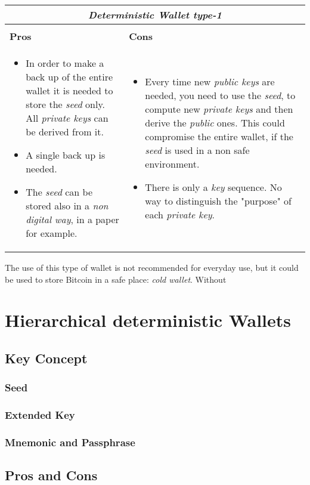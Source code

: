 \begin{center}
	\begin{tabular}{ |p{6cm}|p{6cm}|  }
		\hline
		\multicolumn{2}{|c|}{\textbf{\textit{Deterministic Wallet type-1}}} \\
		\hline \hline 
		\\
		\centerline{\textbf{Pros}}&\centerline{\textbf{Cons}}\\
		\hline
		\begin{itemize}
			\item In order to make a back up of the entire wallet it is needed to store the \textit{seed} only. All \textit{private keys} can be derived from it.
			\item A single back up is needed.
			\item The \textit{seed} can be stored also in a \textit{non digital way}, in a paper for example.
		\end{itemize} &
		\begin{itemize}
			\item Every time new \textit{public keys} are needed, you need to use the \textit{seed}, to compute new \textit{private keys} and then derive the \textit{public} ones. This could compromise the entire wallet, if the \textit{seed} is used in a non safe environment.
			\item There is only a \textit{key} sequence. No way to distinguish the "purpose" of each \textit{private key}.
		\end{itemize}\\
		\hline
	\end{tabular}
\end{center}
The use of this type of wallet is not recommended for everyday use, but it could be used to store Bitcoin in a safe place: \textit{cold wallet}. Without 


\section{Hierarchical deterministic Wallets}

\subsection{Key Concept}

\subsubsection{Seed}

\subsubsection{Extended Key}

\subsubsection{Mnemonic and Passphrase}

\subsection{Pros and Cons}

